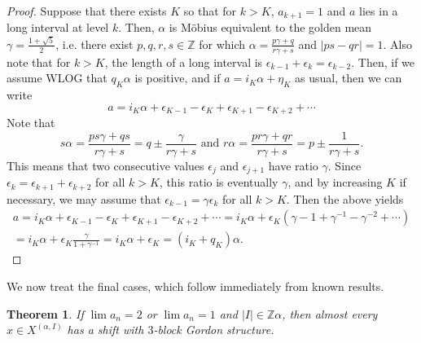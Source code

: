 \documentclass[11pt,reqno]{amsart}
\newtheorem{theorem}{Theorem}[section]
\theoremstyle{definition}
\theoremstyle{plain}
\begin{document}
\begin{proof}
Suppose that there exists $K$ so that for $k > K$, $a_{k+1} = 1$ and $a$ lies in a long interval at level $k$. Then, $\alpha$ is 
M\"{o}bius equivalent to the golden mean $\gamma = \frac{1 + \sqrt{5}}{2}$, i.e. there exist $p,q,r,s \in \mathbb{Z}$ for which $\alpha = \frac{p \gamma + q}{r \gamma + s}$ and $|ps - qr| = 1$. Also note that for $k > K$, the length of a long interval is $\epsilon_{k-1} + \epsilon_k = \epsilon_{k-2}$. Then, if we assume WLOG that $q_K \alpha$ is positive, and if $a = i_K \alpha + \eta_K$ as usual, then we can write
\[
a = i_K \alpha + \epsilon_{K-1} - \epsilon_K + \epsilon_{K+1} - \epsilon_{K+2} + \cdots
\]
Note that 
\[
s\alpha = \frac{ps\gamma + qs}{r \gamma + s} = q \pm \frac{\gamma}{r\gamma + s} \textrm { and }
r\alpha = \frac{pr\gamma + qr}{r \gamma + s} = p \pm \frac{1}{r \gamma + s}.
\]
This means that two consecutive values $\epsilon_j$ and $\epsilon_{j+1}$ have ratio $\gamma$. Since $\epsilon_k = \epsilon_{k+1} + \epsilon_{k+2}$ for all $k > K$, this ratio is eventually $\gamma$, and by increasing $K$ if necessary, we may assume that
$\epsilon_{k-1} = \gamma \epsilon_k$ for all $k > K$. Then the above yields
\begin{multline*}
a = i_K \alpha + \epsilon_{K-1} - \epsilon_{K} + \epsilon_{K+1} - \epsilon_{K+2} + \cdots
= i_K \alpha + \epsilon_{K} (\gamma - 1 + \gamma^{-1} - \gamma^{-2} + \cdots)\\
= i_K \alpha + \epsilon_{K} \frac{\gamma}{1 + \gamma^{-1}}
= i_K \alpha + \epsilon_{K} = (i_K + q_{K})\alpha.
\end{multline*}

\end{proof}

We now treat the final cases, which follow immediately from known results.

\begin{theorem}\label{case5}
If $\lim a_n = 2$ or $\lim a_n = 1$ and $|I| \in \mathbb{Z}\alpha$, then almost every $x \in X^{(\alpha, I)}$ has a shift with $3$-block Gordon structure.
\end{theorem}
\end{document}
